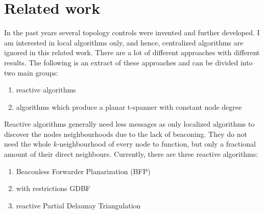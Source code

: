 

%



\section{Related work}

In the past years several topology controls were invented and further developed.
I am interested in local algorithms only, and hence, centralized algorithms are ignored in this related work.
There are a lot of different approaches with different results.
The following is an extract of these approaches and can be divided into two main groups:
\begin{enumerate}
\item reactive algorithms
\item algorithms which produce a planar t-spanner with constant node degree
\end{enumerate}

Reactive algorithms generally need less messages as only localized algorithms to discover the nodes neighbourhoods due to the lack of beaconing.
They do not need the whole $k $-neighbourhood of every node to function, but only a fractional amount of their direct neighbours.
Currently, there are three reactive algorithms:
\begin{enumerate}
\item Beaconless Forwarder Planarization (BFP)
\item with restrictions GDBF
\item reactive Partial Delaunay Triangulation
\end{enumerate}

